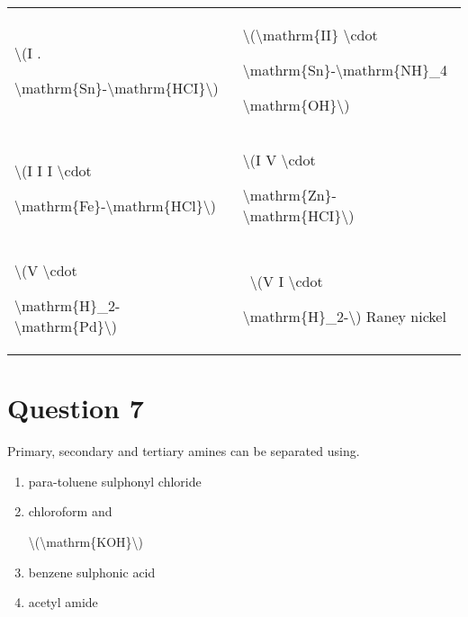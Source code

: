 \documentclass{article}
\begin{document}
\begin{longtable}[]{@{}ll@{}}

\toprule\noalign{}

\endhead

\bottomrule\noalign{}

\endlastfoot

\textbackslash(I .

\textbackslash mathrm\{Sn\}-\textbackslash mathrm\{HCI\}\textbackslash)~

& \textbackslash(\textbackslash mathrm\{II\} \textbackslash cdot

\textbackslash mathrm\{Sn\}-\textbackslash mathrm\{NH\}\_4

\textbackslash mathrm\{OH\}\textbackslash)~ \\

\textbackslash(I I I \textbackslash cdot

\textbackslash mathrm\{Fe\}-\textbackslash mathrm\{HCl\}\textbackslash)~

& \textbackslash(I V \textbackslash cdot

\textbackslash mathrm\{Zn\}-\textbackslash mathrm\{HCI\}\textbackslash)~ \\

\textbackslash(V \textbackslash cdot

\textbackslash mathrm\{H\}\_2-\textbackslash mathrm\{Pd\}\textbackslash)~

& ~\textbackslash(V I \textbackslash cdot

\textbackslash mathrm\{H\}\_2-\textbackslash) Raney nickel \\

\end{longtable}


\begin{enumerate}[label=(\alph*)]
\end{enumerate}
\newpage
\section*{Question 7}
Primary, secondary and tertiary amines can be separated using.


\begin{enumerate}[label=(\alph*)]
\item para-toluene sulphonyl chloride


\item chloroform and

\textbackslash(\textbackslash mathrm\{KOH\}\textbackslash)


\item benzene sulphonic acid


\item acetyl amide


\end{enumerate}
\newpage
\end{document}
